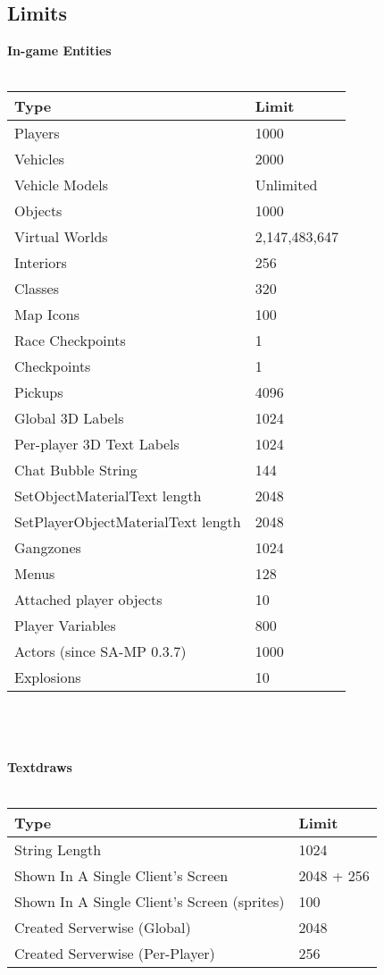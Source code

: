 \documentclass{article}
\begin{document}
\subsection{Limits}
\textbf{In-game Entities}
\\
\\
\begin{tabular}{ |l|l| } 
\hline
Type & Limit \\
\hline
Players & 1000 \\
Vehicles & 2000 \\
Vehicle Models & Unlimited \\
Objects & 1000 \\
Virtual Worlds & 2,147,483,647 \\
Interiors & 256 \\
Classes & 320 \\
Map Icons & 100 \\
Race Checkpoints & 1 \\
Checkpoints & 1 \\
Pickups & 4096 \\
Global 3D Labels & 1024 \\
Per-player 3D Text Labels & 1024 \\
Chat Bubble String & 144 \\
SetObjectMaterialText length & 2048 \\
SetPlayerObjectMaterialText length & 2048 \\
Gangzones & 1024 \\
Menus & 128 \\
Attached player objects & 10 \\
Player Variables & 800 \\
Actors (since SA-MP 0.3.7) & 1000 \\
Explosions & 10 \\
\hline
\end{tabular}
\\
\\
\\\textbf{Textdraws}
\\
\\
\begin{tabular}{ |l|l| } 
\hline
Type & Limit \\
\hline
String Length & 1024 \\
Shown In A Single Client's Screen & 2048 + 256 \\
Shown In A Single Client's Screen (sprites) & 100 \\
Created Serverwise (Global) & 2048 \\
Created Serverwise (Per-Player) & 256 \\
\hline
\end{tabular}
\end{document}
